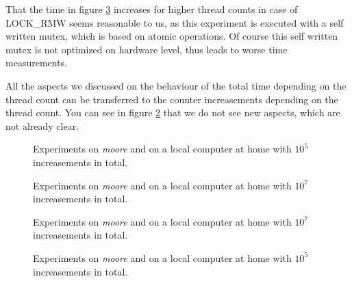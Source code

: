 \documentclass[oneside,a4paper]{scrartcl}
\begin{document}
That the time in figure \ref{plotbigtotal} increases for higher thread
counts in case of LOCK\_RMW seems reasonable to us, as this experiment
is executed with a self written mutex, which is based on atomic operations.
Of course this self written mutex is not optimized on hardware level, thus
leads to worse time measurements.

All the aspects we discussed on the behaviour of the total time depending
on the thread count can be transferred to the counter increasements
depending on the thread count. You can see in figure \ref{plotbig} that
we do not see new aspects, which are not already clear.

\begin{figure}
	\centering
	\caption{Experiments on \emph{moore} and on a local computer at home
	with $10^5$ increasements in total.}
	\label{plot}
\end{figure}

\begin{figure}
	\centering
	\caption{Experiments on \emph{moore} and on a local computer at home
	with $10^7$ increasements in total.}
	\label{plotbig}
\end{figure}

\begin{figure}
	\centering
	\caption{Experiments on \emph{moore} and on a local computer at home
	with $10^7$ increasements in total.}
	\label{plotbigtotal}
\end{figure}
\begin{figure}
	\centering
	\caption{Experiments on \emph{moore} and on a local computer at home
	with $10^5$ increasements in total.}
	\label{plottotal}
\end{figure}
\end{document}
